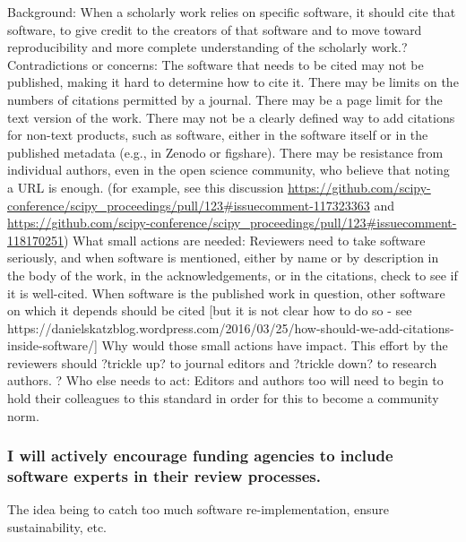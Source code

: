 \documentclass[a4paper,UKenglish]{dagman}
\renewcommand{\paragraph}[1]{\subsubsection*{#1}\xspace}
\begin{document}
   Background: When a scholarly work relies on specific software, it should cite that software, to give credit to the creators of that software and to move toward reproducibility and more complete understanding of the scholarly work.?   Contradictions or concerns: The software that needs to be cited may not be published, making it hard to determine how to cite it.  There may be limits on the numbers of citations permitted by a journal.  There may be a page limit for the text version of the work.  There may not be a clearly defined way to add citations for non-text products, such as software, either in the software itself or in the published metadata (e.g., in Zenodo or figshare). There may be resistance from individual authors, even in the open science community, who believe that noting a URL is enough. (for example, see this discussion 
\url{https://github.com/scipy-conference/scipy_proceedings/pull/123#issuecomment-117323363} and 
\url{https://github.com/scipy-conference/scipy_proceedings/pull/123#issuecomment-118170251}) 
   What small actions are needed: Reviewers need to take software seriously, and when software is mentioned, either by name or by description in the body of the work, in the acknowledgements, or in the citations, check to see if it is well-cited.  When software is the published work in question, other software on which it depends should be cited [but it is not clear how to do so - see https://danielskatzblog.wordpress.com/2016/03/25/how-should-we-add-citations-inside-software/]
   Why would those small actions have impact. This effort by the reviewers should ?trickle up? to journal editors and ?trickle down? to research authors. ?   Who else needs to act: Editors and authors too will need to begin to hold their colleagues to this standard in order for this to become a community norm.



\paragraph{I will actively encourage funding agencies to include software experts in their review processes.}

The idea being to catch too much software re-implementation, ensure sustainability, etc.

\end{document}
